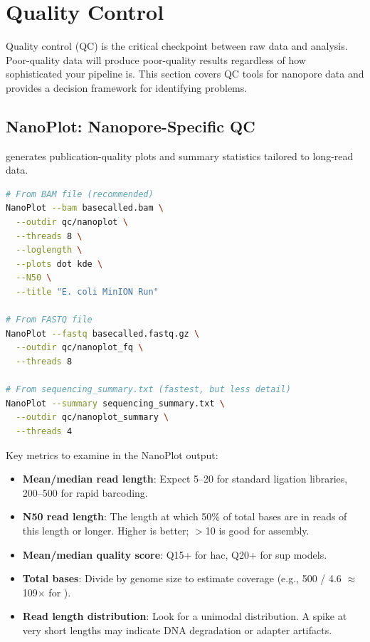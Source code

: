 \section{Quality Control}
\label{sec:diyanalysis:qc}

Quality control (\acrshort{QC}) is the critical checkpoint between raw data and analysis. Poor-quality data will produce poor-quality results regardless of how sophisticated your pipeline is. This section covers \acrshort{QC} tools for nanopore data and provides a decision framework for identifying problems.

\subsection{NanoPlot: Nanopore-Specific QC}
\label{subsec:diyanalysis:nanoplot}

 generates publication-quality plots and summary statistics tailored to long-read data.

\begin{lstlisting}[language=bash,caption={Running NanoPlot on basecalled data.},label=lst:diy-nanoplot]
# From BAM file (recommended)
NanoPlot --bam basecalled.bam \
  --outdir qc/nanoplot \
  --threads 8 \
  --loglength \
  --plots dot kde \
  --N50 \
  --title "E. coli MinION Run"

# From FASTQ file
NanoPlot --fastq basecalled.fastq.gz \
  --outdir qc/nanoplot_fq \
  --threads 8

# From sequencing_summary.txt (fastest, but less detail)
NanoPlot --summary sequencing_summary.txt \
  --outdir qc/nanoplot_summary \
  --threads 4
\end{lstlisting}

Key metrics to examine in the NanoPlot output:
\begin{itemize}[nosep]
  \item \textbf{Mean/median read length}: Expect 5--20\kilobase{} for standard ligation libraries, 200--500\basepair{} for rapid barcoding.
  \item \textbf{N50 read length}: The length at which 50\% of total bases are in reads of this length or longer. Higher is better; $>$10\kilobase{} is good for assembly.
  \item \textbf{Mean/median quality score}: Q15+ for hac, Q20+ for sup models.
  \item \textbf{Total bases}: Divide by genome size to estimate coverage (e.g., 500\megabase{} / 4.6\megabase{} $\approx$ 109$\times$ for ).
  \item \textbf{Read length distribution}: Look for a unimodal distribution. A spike at very short lengths may indicate DNA degradation or adapter artifacts.
\end{itemize}

